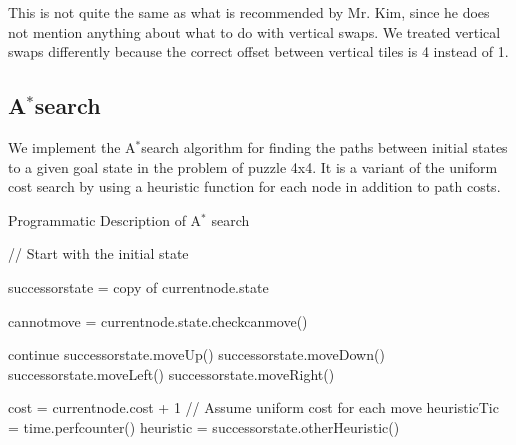 \documentclass{article}
\begin{document}
This is not quite the same as what is recommended by Mr. Kim, since he does not mention anything about what to do with vertical swaps. We treated vertical swaps differently because the correct offset between vertical tiles is 4 instead of 1. 

\subsection{A$^*$search}
We implement the A$^*$search algorithm for finding the paths between initial states to a given goal state in the problem of puzzle 4x4. It is a variant of the uniform cost search by using a heuristic function for each node in addition to path costs.
\begin{algorithm}[h]
  
  \caption{Programmatic Description of A$^*$ search}
   \begin{algorithmic}
     // Start with the initial state
        
    
    \EndIf


            \State successorstate = copy of currentnode.state
            
            \State cannotmove = currentnode.state.checkcanmove()
            
            \State continue
            \EndIf
            \State successorstate.moveUp()
            \EndIf
            \State successorstate.moveDown()
            \EndIf
            \State successorstate.moveLeft()
            \EndIf
            \State successorstate.moveRight()
            \EndIf

            \State cost = currentnode.cost + 1  // Assume uniform cost for each move
            \State heuristicTic = time.perfcounter()
            \State heuristic = successorstate.otherHeuristic()
           

\end{algorithmic}
\end{algorithm}
\end{document}
